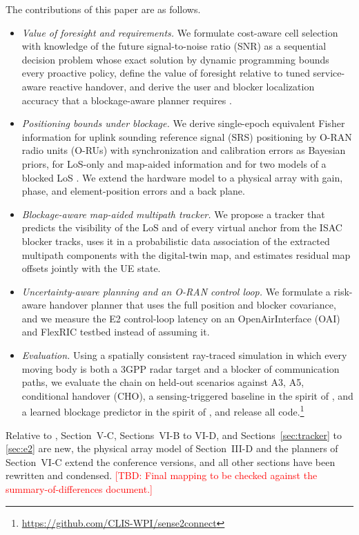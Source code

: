 \documentclass[journal]{IEEEtran}
\newcommand{\tbd}[1]{\textcolor{red}{[TBD: #1]}}
\begin{document}
The contributions of this paper are as follows.
\begin{itemize}
\item \emph{Value of foresight and requirements.} We formulate
cost-aware cell selection with knowledge of the future signal-to-noise
ratio (SNR) as a sequential decision problem whose exact solution by
dynamic programming bounds every proactive policy, define the value of
foresight relative to tuned service-aware reactive handover, and derive
the user and blocker localization accuracy that a blockage-aware planner
requires \cite{natanzi2027wcncA}.
\item \emph{Positioning bounds under blockage.} We derive single-epoch
equivalent Fisher information for uplink sounding reference signal (SRS)
positioning by O-RAN radio units (O-RUs) with synchronization and
calibration errors as Bayesian priors, for LoS-only and map-aided
information and for two models of a blocked LoS \cite{natanzi2027wcncB}.
\textcolor{propcol}{We extend the hardware model to a physical array
with gain, phase, and element-position errors and a back plane.}
\item \textcolor{propcol}{\emph{Blockage-aware map-aided multipath
tracker.} We propose a tracker that predicts the visibility of the LoS
and of every virtual anchor from the ISAC blocker tracks, uses it in a
probabilistic data association of the extracted multipath components
with the digital-twin map, and estimates residual map offsets jointly
with the UE state.}
\item \textcolor{propcol}{\emph{Uncertainty-aware planning and an O-RAN
control loop.} We formulate a risk-aware handover planner that uses the
full position and blocker covariance, and we measure the E2 control-loop
latency on an OpenAirInterface (OAI) and FlexRIC testbed
\cite{nikaein2014oai,schmidt2021flexric} instead of assuming it.}
\item \emph{Evaluation.} Using a spatially consistent ray-traced
simulation in which every moving body is both a 3GPP radar target and a
blocker of communication paths, we evaluate the chain on held-out
scenarios against A3, A5, \textcolor{propcol}{conditional handover (CHO),
a sensing-triggered baseline in the spirit of \cite{li2025lookbefore},
and a learned blockage predictor in the spirit of
\cite{alquraan2023radar}}, and release all code.\footnote{%
\url{https://github.com/CLIS-WPI/sense2connect}}
\end{itemize}

Relative to \cite{natanzi2027wcncA,natanzi2027wcncB}, Section~V-C,
Sections~VI-B to VI-D, and Sections~\ref{sec:tracker} to \ref{sec:e2}
are new, the physical array model of Section~III-D and the planners of
Section~VI-C extend the conference versions, and all other sections
have been rewritten and condensed. \tbd{Final mapping to be checked
against the summary-of-differences document.}
\end{document}

